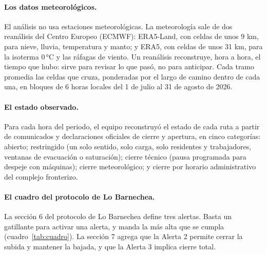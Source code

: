 \documentclass[11pt,a4paper]{article}
\begin{document}
\paragraph{Los datos meteorológicos.} El análisis no usa estaciones meteorológicas. La meteorología sale de dos reanálisis del Centro Europeo (ECMWF): ERA5-Land, con celdas de unos 9 km, para nieve, lluvia, temperatura y manto; y ERA5, con celdas de unos 31 km, para la isoterma 0\,°C y las ráfagas de viento. Un reanálisis reconstruye, hora a hora, el tiempo que hubo: sirve para revisar lo que pasó, no para anticipar. Cada tramo promedia las celdas que cruza, ponderadas por el largo de camino dentro de cada una, en bloques de 6 horas locales del 1 de julio al 31 de agosto de 2026.

\paragraph{El estado observado.} Para cada hora del periodo, el equipo reconstruyó el estado de cada ruta a partir de comunicados y declaraciones oficiales de cierre y apertura, en cinco categorías: abierto; restringido (un solo sentido, solo carga, solo residentes y trabajadores, ventanas de evacuación o saturación); cierre técnico (pausa programada para despeje con máquinas); cierre meteorológico; y cierre por horario administrativo del complejo fronterizo.

\paragraph{El cuadro del protocolo de Lo Barnechea.} La sección 6 del protocolo de Lo Barnechea define tres alertas. Basta un gatillante para activar una alerta, y manda la más alta que se cumpla (cuadro~\ref{tab:cuadro}). La sección 7 agrega que la Alerta 2 permite cerrar la subida y mantener la bajada, y que la Alerta 3 implica cierre total.
\end{document}
